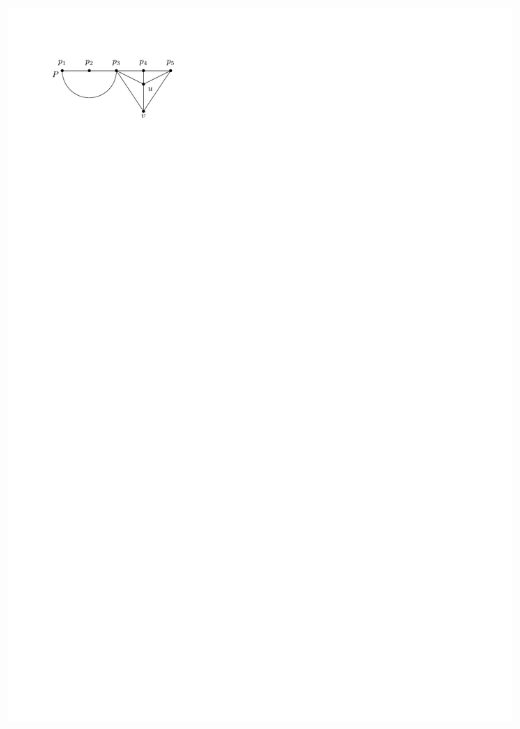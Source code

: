 \documentclass[a4paper]{article}
\begin{document}
\includegraphics[scale=1]{./unifiedAlgo/img/rightNeighbourwalk/chords.pdf}
\clearpage%
\end{document}
